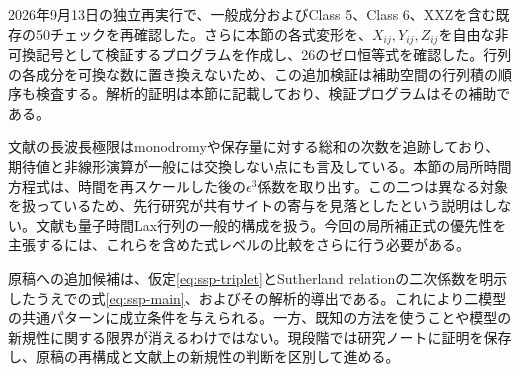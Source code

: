 2026年9月13日の独立再実行で、一般成分およびClass 5、Class 6、XXZを含む既存の50チェックを再確認した。さらに本節の各式変形を、$X_{ij},Y_{ij},Z_{ij}$を自由な非可換記号として検証するプログラムを作成し、26のゼロ恒等式を確認した。行列の各成分を可換な数に置き換えないため、この追加検証は補助空間の行列積の順序も検査する。解析的証明は本節に記載しており、検証プログラムはその補助である。

文献\cite{ADS2010}の長波長極限はmonodromyや保存量に対する総和の次数を追跡しており、期待値と非線形演算が一般には交換しない点にも言及している。本節の局所時間方程式は、時間を再スケールした後の$\epsilon^3$係数を取り出す。この二つは異なる対象を扱っているため、先行研究が共有サイトの寄与を見落としたという説明はしない。文献\cite{DoikouFindlay2017}も量子時間Lax行列の一般的構成を扱う。今回の局所補正式の優先性を主張するには、これらを含めた式レベルの比較をさらに行う必要がある。

原稿への追加候補は、仮定\eqref{eq:ssp-triplet}とSutherland relationの二次係数を明示したうえでの式\eqref{eq:ssp-main}、およびその解析的導出である。これにより二模型の共通パターンに成立条件を与えられる。一方、既知の方法を使うことや模型の新規性に関する限界が消えるわけではない。現段階では研究ノートに証明を保存し、原稿の再構成と文献上の新規性の判断を区別して進める。
